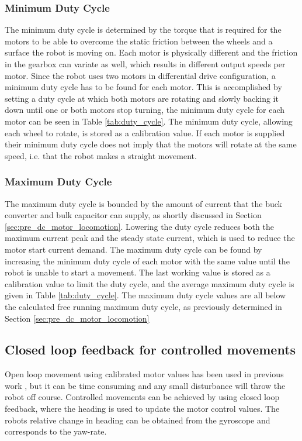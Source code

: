 \subsubsection{Minimum Duty Cycle}

The minimum duty cycle is determined by the torque that is required for the motors to be able to overcome the static friction between the wheels and a surface the robot is moving on.
Each motor is physically different and the friction in the gearbox can variate as well, which results in different output speeds per motor.
Since the robot uses two motors in differential drive configuration, a minimum duty cycle has to be found for each motor.
This is accomplished by setting a duty cycle at which both motors are rotating and slowly backing it down until one or both motors stop turning, the minimum duty cycle for each motor can be seen in Table \ref{tab:duty_cycle}.
The minimum duty cycle, allowing each wheel to rotate, is stored as a calibration value.
If each motor is supplied their minimum duty cycle does not imply that the motors will rotate at the same speed, i.e. that the robot makes a straight movement.

\subsubsection{Maximum Duty Cycle}

The maximum duty cycle is bounded by the amount of current that the buck converter and bulk capacitor can supply, as shortly discussed in Section \ref{sec:pre_dc_motor_locomotion}.
Lowering the duty cycle reduces both the maximum current peak and the steady state current, which is used to reduce the motor start current demand.
The maximum duty cycle can be found by increasing the minimum duty cycle of each motor with the same value until the robot is unable to start a movement.
The last working value is stored as a calibration value to limit the duty cycle, and the average maximum duty cycle is given in Table \ref{tab:duty_cycle}.
The maximum duty cycle values are all below the calculated free running maximum duty cycle, as previously determined in Section \ref{sec:pre_dc_motor_locomotion}


\subsection{Closed loop feedback for controlled movements}

Open loop movement using calibrated motor values has been used in previous work \cite{legoc_uist_2016}, but it can be time consuming and any small disturbance will throw the robot off course.
Controlled movements can be achieved by using closed loop feedback, where the heading is used to update the motor control values.
The robots relative change in heading can be obtained from the gyroscope and corresponds to the yaw-rate.

